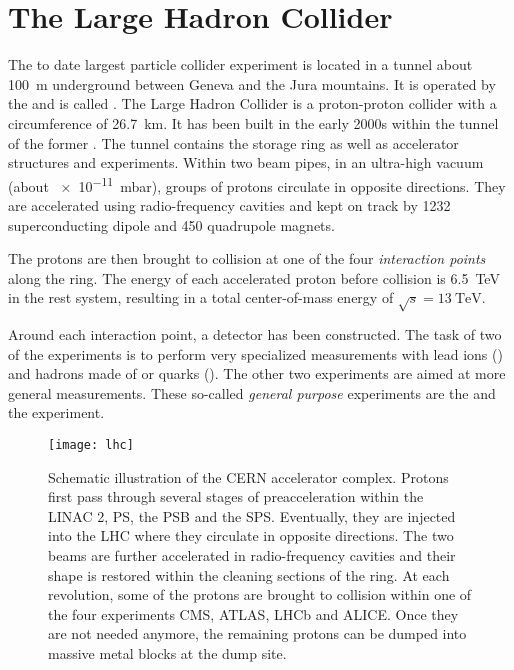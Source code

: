 \section{The Large Hadron Collider}
The to date largest particle collider experiment is located in a tunnel about \SI{100}{\m} underground between Geneva and the Jura mountains. It is operated by the  and is called .
The Large Hadron Collider\cite{Evans:LHCMachine} is a proton-proton collider with a circumference of \SI{26.7}{\km}. It has been built in the early 2000s within the tunnel of the former . The tunnel contains the storage ring as well as accelerator structures and experiments. Within two beam pipes, in an ultra-high vacuum (about \SI{e-11}{\milli\bar}), groups of protons circulate in opposite directions. They are accelerated using radio-frequency cavities and kept on track by \num{1232} superconducting dipole and \num{450} quadrupole magnets.

The protons are then brought to collision at one of the four \emph{interaction points} along the ring. The energy of each accelerated proton before collision is \SI{6.5}{\TeV} in the rest system, resulting in a total center-of-mass energy of $\sqrt{s} = \SI{13}{\TeV}$.

Around each interaction point, a detector has been constructed. The task of two of the experiments is to perform very specialized measurements with lead ions () and hadrons made of \Pcharm or \Pbottom quarks (). 
The other two experiments are aimed at more general measurements. These so-called \emph{general purpose} experiments are the  and the  experiment. 

\begin{figure}
    \centering
    \texttt{[image: lhc]}
    \caption{Schematic illustration of the \acs{CERN} accelerator complex\cite{Ley:CERNAccelerators,Caron:LHCLayout,DeMelis:CERNacceleratorcomplex}. Protons first pass through several stages of preacceleration within the \ac{LINAC} 2, \ac{PS}, the \ac{PSB} and the \ac{SPS}. Eventually, they are injected into the \ac{LHC} where they circulate in opposite directions. The two beams are further accelerated in radio-frequency cavities and their shape is restored within the cleaning sections of the ring. At each revolution, some of the protons are brought to collision within one of the four experiments \acs{CMS}, \acs{ATLAS}, \acs{LHCb} and \acs{ALICE}. Once they are not needed anymore, the remaining protons can be dumped into massive metal blocks at the dump site.
    }
    \label{fig:LHC}
\end{figure}

